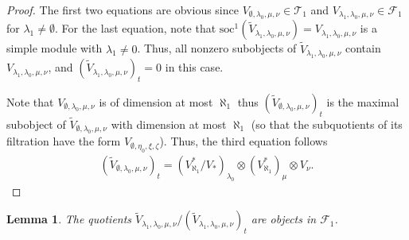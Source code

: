 \documentclass[openany, a4paper]{amsbook}
\newtheorem{lem}[thm]{Lemma}
\theoremstyle{definition}
\numberwithin{equation}{chapter}
\newcommand{\soc}[2]{\mathrm{soc}^{#1}({#2})}
\begin{document}
\begin{proof}
    The first two equations are obvious since $V_{\emptyset, \lambda_0, \mu, \nu} \in \mathcal{T}_1$ and  $V_{\lambda_1, \lambda_0, \mu, \nu} \in \mathcal{F}_1$ for $\lambda_1 \neq \emptyset$. For the last equation, note that $\soc{1}{\tilde{V}_{\lambda_1, \lambda_0, \mu, \nu}} = {V}_{\lambda_1, \lambda_0, \mu, \nu}$ is a simple module with $\lambda_1 \neq 0$. Thus, all nonzero subobjects of $\tilde{V}_{\lambda_1, \lambda_0, \mu, \nu}$ contain ${V}_{\lambda_1, \lambda_0, \mu, \nu}$, and $ (\tilde{V}_{\lambda_1, \lambda_0, \mu, \nu})_t = 0$ in this case.
    
    Note that ${V}_{\emptyset, \lambda_0, \mu, \nu}$ is of dimension at most $\aleph_{1}$ thus $(\tilde{V}_{\emptyset, \lambda_0, \mu, \nu})_t$ is the maximal subobject of $\tilde{V}_{\emptyset, \lambda_0, \mu, \nu}$ with dimension at most $\aleph_{1}$ (so that the subquotients of its filtration have the form $V_{\emptyset, \eta_0, \xi, \zeta}$). 
    Thus, the third equation follows
    \begin{align*}
        (\tilde{V}_{\emptyset, \lambda_0, \mu, \nu})_t = (V^{\ast}_{\aleph_1}/V_{\ast})_{\lambda_0} \otimes (V^{\ast}_{\aleph_1})_\mu \otimes V_\nu.
    \end{align*}
\end{proof}

\begin{lem}\label{lemma 2 torsion 1}
    The quotients $\tilde{V}_{\lambda_1, \lambda_0, \mu, \nu}/(\tilde{V}_{\lambda_1, \lambda_0, \mu, \nu})_t$ are objects in $\mathcal{F}_1$.
\end{lem}
\end{document}

